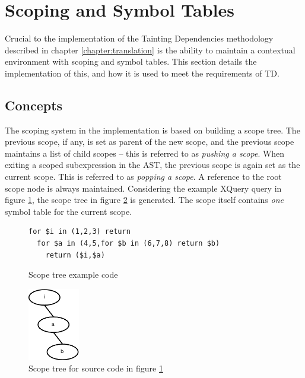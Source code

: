 \section{Scoping and Symbol Tables}
Crucial to the implementation of the Tainting Dependencies methodology
described in chapter \ref{chapter:translation} is the ability to
maintain a contextual environment with scoping and symbol tables. This section
details the implementation of this, and how it is used to meet the
requirements of TD.

\subsection{Concepts}
The scoping system in the implementation is based on building a scope tree. The
previous scope, if any, is set as parent of the new scope, and the previous
scope maintains a list of child scopes -- this is referred to as
\textit{pushing a scope}. When exiting a scoped subexpression in the AST, the
previous scope is again set as the current scope. This is referred to as
\textit{popping a scope}. A reference to the root scope node is always
maintained. Considering the example XQuery query in figure
\ref{fig:impl:scope_tree_ex_code}, the scope tree in figure
\ref{fig:impl:scope_tree_ex} is generated. The scope itself contains \emph{one}
symbol table for the current scope.

\begin{figure}[!htp]
\begin{center}
\begin{minipage}[h]{9cm}
\begin{verbatim}
for $i in (1,2,3) return 
  for $a in (4,5,for $b in (6,7,8) return $b) 
    return ($i,$a)
\end{verbatim}
  \caption{Scope tree example code}
  \label{fig:impl:scope_tree_ex_code}
  \end{minipage}
\end{center}
\end{figure}

\begin{figure}[!htp]
\begin{center}
  \includegraphics[width=0.2\textwidth]{diagrams/scope_tree_ex}
  \caption{Scope tree for source code in figure
  \ref{fig:impl:scope_tree_ex_code}} 
  \label{fig:impl:scope_tree_ex}
\end{center}
\end{figure}

